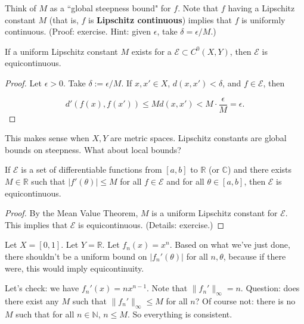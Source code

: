 Think of \(M\) as a ``global steepness bound" for \(f\). Note that \(f\) having a Lipschitz constant \(M\) (that is, \(f\) is \textbf{Lipschitz continuous}) implies that \(f\) is uniformly continuous. (Proof: exercise. Hint: given \(\epsilon\), take \(\delta = \epsilon/M\).)



\begin{proposition}\label{ra.prop.lipschitz.equi}

If a uniform Lipschitz constant \(M\) exists for a \(\mathcal{E} \subset C^0(X, Y)\), then \(\mathcal{E}\) is equicontinuous.

\end{proposition}

\begin{proof}

Let \(\epsilon >0\). Take \(\delta := \epsilon/M\). If \(x, x' \in X\), \(d(x, x') < \delta\), and \(f \in \mathcal{E}\), then 

\[
d'(f(x), f(x')) \leq M d(x, x') < M\cdot  \frac{\epsilon}{M} = \epsilon.
\]

\end{proof}

This makes sense when \(X, Y\) are metric spaces. Lipschitz constants are global bounds on steepness. What about local bounds?

\begin{corollary}

If \(\mathcal{E}\) is a set of differentiable functions from \([a,b]\) to \(\mathbb{R}\) (or \(\mathbb{C}\)) and there exists \(M \in \mathbb{R}\) such that \(|f'(\theta)| \leq M\) for all \(f \in \mathcal{E}\) and for all \(\theta \in [a,b]\), then \(\mathcal{E}\) is equicontinuous.

\end{corollary}

\begin{proof}

By the Mean Value Theorem, \(M\) is a uniform Lipschitz constant for \(\mathcal{E}\). This implies that \(\mathcal{E}\) is equicontinuous. (Details: exercise.)

\end{proof}

\begin{example} Let \(X = [0,1]\). Let \(Y = \mathbb{R}\). Let \(f_n(x) = x^n\). Based on what we've just done, there shouldn't be a uniform bound on \(|f_n'(\theta)|\) for all \(n, \theta\), because if there were, this would imply equicontinuity. 

Let's check: we have \(f_n'(x) = nx^{n-1}\). Note that \(\lVert f_n' \rVert_\infty = n\). Question: does there exist any \(M\) such that \(\lVert f_n' \rVert_\infty \leq M\) for all \(n\)? Of course not: there is no \(M\) such that for all \(n \in \mathbb{N}\), \(n \leq M\). So everything is consistent.

\end{example}




